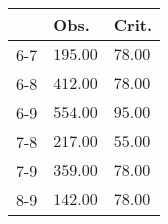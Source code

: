 \begin{table}[ht]
\centering
\begin{tabular}{rll}
  \hline
 & Obs. & Crit. \\ 
  \hline
6-7 & \(\mathbf{195.00}\) & \(\mathbf{78.00}\) \\ 
  6-8 & \(\mathbf{412.00}\) & \(\mathbf{78.00}\) \\ 
  6-9 & \(\mathbf{554.00}\) & \(\mathbf{95.00}\) \\ 
  7-8 & \(\mathbf{217.00}\) & \(\mathbf{55.00}\) \\ 
  7-9 & \(\mathbf{359.00}\) & \(\mathbf{78.00}\) \\ 
  8-9 & \(\mathbf{142.00}\) & \(\mathbf{78.00}\) \\ 
   \hline
\end{tabular}
\end{table}
